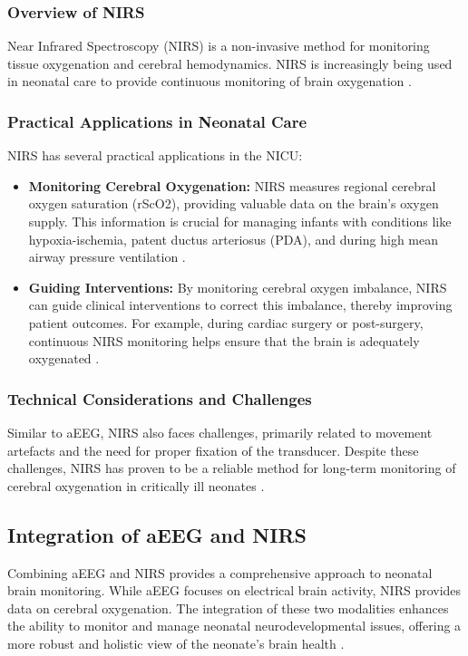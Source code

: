 \documentclass[12pt,journal,compsoc]{IEEEtran}
\begin{document}
\subsubsection{Overview of NIRS}
Near Infrared Spectroscopy (NIRS) is a non-invasive method for monitoring tissue oxygenation and cerebral hemodynamics. NIRS is increasingly being used in neonatal care to provide continuous monitoring of brain oxygenation \cite{IEEEhowto:toet}.

\subsubsection{Practical Applications in Neonatal Care}
NIRS has several practical applications in the NICU:

\begin{itemize}
    \item \textbf{Monitoring Cerebral Oxygenation:} NIRS measures regional cerebral oxygen saturation (rScO2), providing valuable data on the brain's oxygen supply. This information is crucial for managing infants with conditions like hypoxia-ischemia, patent ductus arteriosus (PDA), and during high mean airway pressure ventilation \cite{IEEEhowto:toet}.
    \item \textbf{Guiding Interventions:} By monitoring cerebral oxygen imbalance, NIRS can guide clinical interventions to correct this imbalance, thereby improving patient outcomes. For example, during cardiac surgery or post-surgery, continuous NIRS monitoring helps ensure that the brain is adequately oxygenated \cite{IEEEhowto:toet}.
\end{itemize}

\subsubsection{Technical Considerations and Challenges}
Similar to aEEG, NIRS also faces challenges, primarily related to movement artefacts and the need for proper fixation of the transducer. Despite these challenges, NIRS has proven to be a reliable method for long-term monitoring of cerebral oxygenation in critically ill neonates \cite{IEEEhowto:toet}.

\subsection{Integration of aEEG and NIRS}
Combining aEEG and NIRS provides a comprehensive approach to neonatal brain monitoring. While aEEG focuses on electrical brain activity, NIRS provides data on cerebral oxygenation. The integration of these two modalities enhances the ability to monitor and manage neonatal neurodevelopmental issues, offering a more robust and holistic view of the neonate's brain health \cite{IEEEhowto:toet}.
\end{document}

